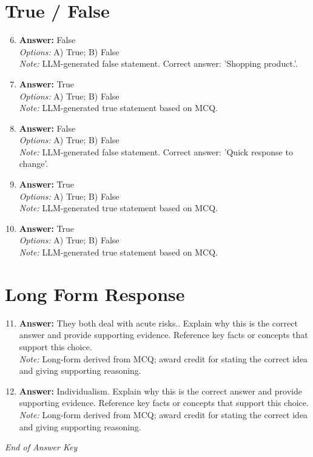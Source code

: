 \documentclass[12pt]{article}
\begin{document}
\section*{True / False}
\begin{enumerate}[label=\arabic*.]
\setcounter{enumi}{5}
\item \textbf{Answer:} False
\\ \textit{Options:} A) True; B) False
\\ \textit{Note:} LLM-generated false statement. Correct answer: 'Shopping product.'.
\item \textbf{Answer:} True
\\ \textit{Options:} A) True; B) False
\\ \textit{Note:} LLM-generated true statement based on MCQ.
\item \textbf{Answer:} False
\\ \textit{Options:} A) True; B) False
\\ \textit{Note:} LLM-generated false statement. Correct answer: 'Quick response to change'.
\item \textbf{Answer:} True
\\ \textit{Options:} A) True; B) False
\\ \textit{Note:} LLM-generated true statement based on MCQ.
\item \textbf{Answer:} True
\\ \textit{Options:} A) True; B) False
\\ \textit{Note:} LLM-generated true statement based on MCQ.
\end{enumerate}

\section*{Long Form Response}
\begin{enumerate}[label=\arabic*.]
\setcounter{enumi}{10}
\item \textbf{Answer:} They both deal with acute risks.. Explain why this is the correct answer and provide supporting evidence. Reference key facts or concepts that support this choice.
\\ \textit{Note:} Long-form derived from MCQ; award credit for stating the correct idea and giving supporting reasoning.
\item \textbf{Answer:} Individualism. Explain why this is the correct answer and provide supporting evidence. Reference key facts or concepts that support this choice.
\\ \textit{Note:} Long-form derived from MCQ; award credit for stating the correct idea and giving supporting reasoning.
\end{enumerate}

\vfill
\noindent\textit{End of Answer Key}
\end{document}
